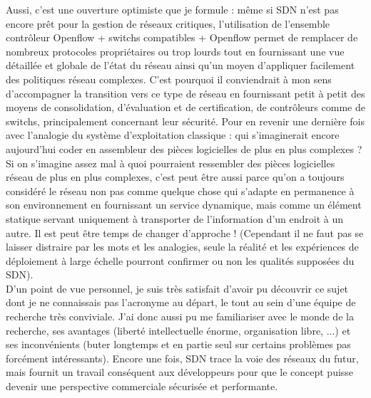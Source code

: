 Aussi, c'est une ouverture optimiste que je formule : même si SDN n'est pas encore prêt pour la gestion de réseaux critiques, l'utilisation de l'ensemble contrôleur Openflow + switchs compatibles + Openflow permet de remplacer de nombreux protocoles propriétaires ou trop lourds tout en fournissant une vue détaillée et globale de l'état du réseau ainsi qu'un moyen d'appliquer facilement des politiques réseau complexes. C'est pourquoi il conviendrait à mon sens d'accompagner la transition vers ce type de réseau en fournissant petit à petit des moyens de consolidation, d'évaluation et de certification, de contrôleurs comme de switchs, principalement concernant leur sécurité. Pour en revenir une dernière fois avec l'analogie du système d'exploitation classique : qui s'imaginerait encore aujourd'hui coder en assembleur des pièces logicielles de plus en plus complexes ? Si on s'imagine assez mal à quoi pourraient ressembler des pièces logicielles réseau de plus en plus complexes, c'est peut être aussi parce qu'on a toujours considéré le réseau non pas comme quelque chose qui s'adapte en permanence à son environnement en fournissant un service dynamique, mais comme un élément statique servant uniquement à transporter de l'information d'un endroit à un autre. Il est peut être temps de changer d'approche ! (Cependant il ne faut pas se laisser distraire par les mots et les analogies, seule la réalité et les expériences de déploiement à large échelle pourront confirmer ou non les qualités supposées du SDN).\\

D’un point de vue personnel, je suis très satisfait d'avoir pu découvrir ce sujet dont je ne connaissais pas l'acronyme au départ, le tout au sein d'une équipe de recherche très conviviale. J'ai donc aussi pu me familiariser avec le monde de la recherche, ses avantages (liberté intellectuelle énorme, organisation libre, ...) et ses inconvénients (buter longtemps et en partie seul sur certains problèmes pas forcément intéressants). Encore une fois, SDN trace la voie des réseaux du futur, mais fournit un travail conséquent aux développeurs pour que le concept puisse devenir une perspective commerciale sécurisée et performante.